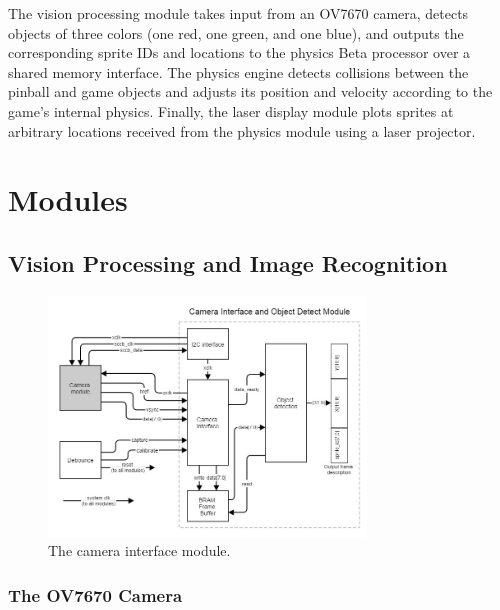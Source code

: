 \documentclass{article}
\begin{document}
The vision processing module takes input from an OV7670 camera, detects objects of three colors (one red, one green, and one blue), and outputs the corresponding sprite IDs and locations to the physics Beta processor over a shared memory interface. The physics engine detects collisions between the pinball and game objects and adjusts its position and velocity according to the game's internal physics. Finally, the laser display module plots sprites at arbitrary locations received from the physics module using a laser projector.


\section{Modules} \label{modules}
\subsection{Vision Processing and Image Recognition} \label{vp}

\begin{figure}[H]
\begin{center}
\includegraphics[width=0.75\textwidth]{camera} 
\caption{The camera interface module.}
\end{center}
\end{figure}

\subsubsection{The OV7670 Camera} \label{cameraintro}
\end{document}
